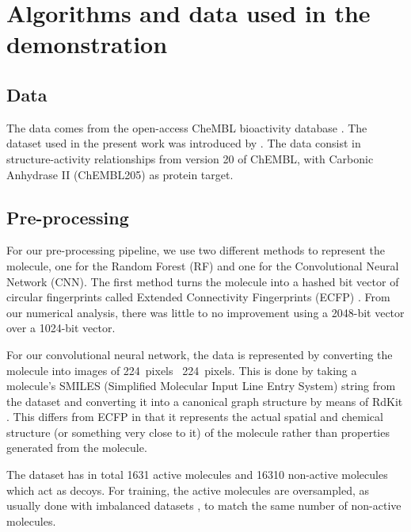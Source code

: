 \documentclass[\ifafour a4paper,12pt,\else a5paper,10pt,\fi%
onecolumn,oneside,article,%
british%
]{memoir}
\theoremstyle{remark}
\theoremstyle{innote}
\renewcommand*{\|}[1][]{\nonscript\:#1\vert\nonscript\:\mathopen{}}
\begin{document}
\section{Algorithms and data used in the demonstration}
 
\subsection{Data} 
  
The data comes from the open-access CheMBL bioactivity database \autocites{bentoetal2014}. The dataset used in the present work was introduced by \textcite{koutsoukasetal2017}. The data consist in structure-activity relationships from version 20 of ChEMBL, with Carbonic Anhydrase II (ChEMBL205) as protein target.


\subsection{Pre-processing} 

For our pre-processing pipeline, we use two different methods to represent the molecule, one for the Random Forest (RF) and one for the Convolutional Neural Network (CNN). The first method turns the molecule into a hashed bit vector of circular fingerprints called Extended Connectivity Fingerprints (ECFP) \autocites{rogersetal2010}. From our numerical analysis, there was little to no improvement using a 2048-bit vector over a 1024-bit vector. 
  
For our convolutional neural network, the data is represented by converting the molecule into images of 224~pixels \texttimes\ 224~pixels. This is done by taking a molecule's SMILES (Simplified Molecular Input Line Entry System) string \autocites{davidetal2020} from the dataset and converting it into a canonical graph structure by means of RdKit \autocites{rdkit2017}. This differs from ECFP in that it represents the actual spatial and chemical structure (or something very close to it) of the molecule rather than properties generated from the molecule.

The dataset has in total 1631 active molecules and 16310 non-active molecules which act as decoys. For training, the active molecules are oversampled, as usually done with imbalanced datasets \autocites{provost2000}, to match the same number of non-active molecules.
\end{document}
